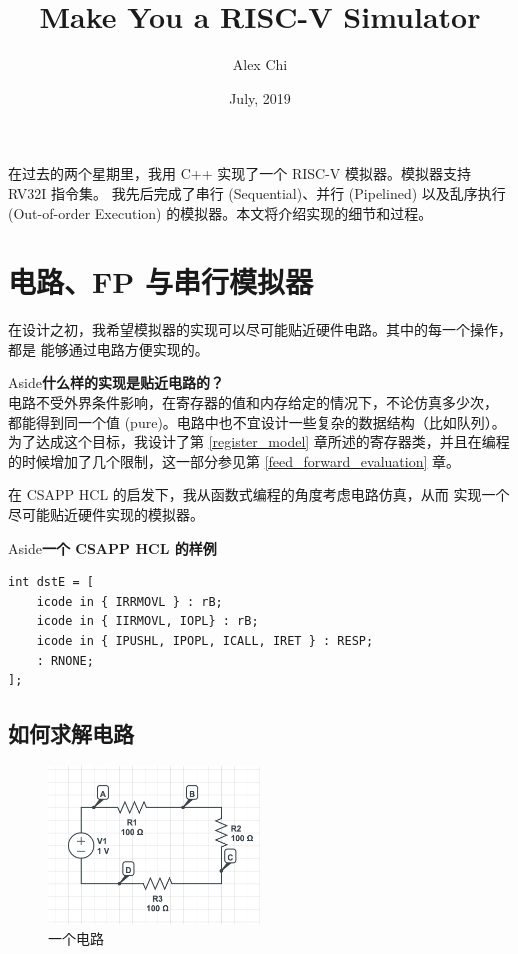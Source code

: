 \documentclass[12pt]{article}
\title{Make You a RISC-V Simulator}
\author{Alex Chi}
\date{July, 2019}
\newenvironment{aside}[1]
    { \begin{tcolorbox}[enlarge top by=0.5cm, enlarge bottom by=0.5cm] Aside\space\space\space\space \textbf{#1} \\
        } { \end{tcolorbox} }
\begin{document}
\maketitle 

    在过去的两个星期里，我用 C++ 实现了一个 RISC-V 模拟器。模拟器支持 RV32I 指令集。
    我先后完成了串行 (Sequential)、并行 (Pipelined) 以及乱序执行 (Out-of-order Execution)
    的模拟器。本文将介绍实现的细节和过程。

    \section{电路、FP 与串行模拟器}
    
    在设计之初，我希望模拟器的实现可以尽可能贴近硬件电路。其中的每一个操作，都是
    能够通过电路方便实现的。

    \begin{aside}{什么样的实现是贴近电路的？}
        电路不受外界条件影响，在寄存器的值和内存给定的情况下，不论仿真多少次，
        都能得到同一个值 (pure)。电路中也不宜设计一些复杂的数据结构（比如队列）。
        为了达成这个目标，我设计了第 \ref{register_model}
        章所述的寄存器类，并且在编程的时候增加了几个限制，这一部分参见第 
        \ref{feed_forward_evaluation} 章。
    \end{aside}

    在 CSAPP HCL 的启发下，我从函数式编程的角度考虑电路仿真，从而
    实现一个尽可能贴近硬件实现的模拟器。

    \begin{aside}{一个 CSAPP HCL 的样例}
        \begin{verbatim}
int dstE = [
    icode in { IRRMOVL } : rB; 
    icode in { IIRMOVL, IOPL} : rB; 
    icode in { IPUSHL, IPOPL, ICALL, IRET } : RESP; 
    : RNONE;
];
        \end{verbatim}
    \end{aside}

    \subsection{如何求解电路}

    \begin{figure}[h]
        \centering
        \includegraphics[width=0.5\textwidth]{circuit}
        \caption{一个电路}
        \label{fig:circuit}
    \end{figure}
\end{document}
